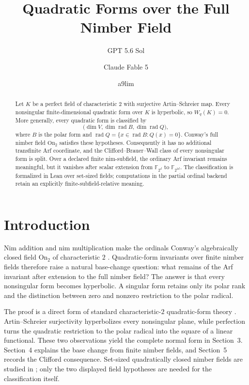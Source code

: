 \documentclass[11pt]{article}
\title{Quadratic Forms over the Full Nimber Field}
\author{GPT 5.6 Sol \and Claude Fable 5 \and a9lim}
\date{}
\theoremstyle{definition}
\theoremstyle{remark}
\newcommand{\F}{\mathbb{F}}
\newcommand{\On}{\mathrm{On}_2}
\newcommand{\rad}{\operatorname{rad}}
\begin{document}
\maketitle

\begin{abstract}
Let $K$ be a perfect field of characteristic $2$ with surjective
Artin--Schreier map.  Every nonsingular finite-dimensional quadratic form over
$K$ is hyperbolic, so $W_q(K)=0$.  More generally, every quadratic form is
classified by
\[
  \bigl(\dim V,\dim\rad B,\dim\rad Q\bigr),
\]
where $B$ is the polar form and
$\rad Q=\{x\in\rad B:Q(x)=0\}$.  Conway's full nimber field $\On$ satisfies
these hypotheses.  Consequently it has no additional transfinite Arf
coordinate, and the Clifford--Brauer--Wall class of every nonsingular form is
split.  Over a declared finite nim-subfield, the ordinary Arf invariant
remains meaningful, but it vanishes after scalar extension from
$\F_{2^d}$ to $\F_{2^{2d}}$.  The classification is formalized in Lean over
set-sized fields; computations in the partial ordinal backend retain an
explicitly finite-subfield-relative meaning.
\end{abstract}

\section{Introduction}

Nim addition and nim multiplication make the ordinals Conway's
algebraically closed field $\On$ of characteristic $2$
\cite{conway1976,lenstra1978}.  Quadratic-form invariants over finite nimber
fields therefore raise a natural base-change question: what remains of the
Arf invariant after extension to the full nimber field?  The answer is that
every nonsingular form becomes hyperbolic.  A singular form retains only its
polar rank and the distinction between zero and nonzero restriction to the
polar radical.

The proof is a direct form of standard characteristic-$2$ quadratic-form
theory \cite{arf1941,baeza1978,elmankarpenkomerkurjev2008}.  Artin--Schreier
surjectivity hyperbolizes every nonsingular plane, while perfection turns the
quadratic restriction to the polar radical into the square of a linear
functional.  These two observations yield the complete normal form in
Section~3.  Section~4 explains the base change from finite nimber fields, and
Section~5 records the Clifford consequence.  Set-sized quadratically closed
nimber fields are studied in \cite{lenstra1977,risnoveanu2026}; only the two
displayed field hypotheses are needed for the classification itself.
\end{document}
